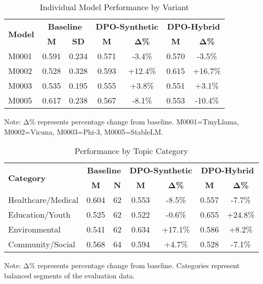 \begin{table}[htbp]
\centering
\caption{Individual Model Performance by Variant}
\label{tab:model-specific}
\begin{tabular}{lcccccc}
\toprule
\multirow{2}{*}{\textbf{Model}} & \multicolumn{2}{c}{\textbf{Baseline}} & \multicolumn{2}{c}{\textbf{DPO-Synthetic}} & \multicolumn{2}{c}{\textbf{DPO-Hybrid}} \\
\cmidrule(lr){2-3} \cmidrule(lr){4-5} \cmidrule(lr){6-7}
& \textbf{M} & \textbf{SD} & \textbf{M} & \textbf{Δ\%} & \textbf{M} & \textbf{Δ\%} \\
\midrule
M0001 & 0.591 & 0.234 & 0.571 & -3.4\% & 0.570 & -3.5\% \\
M0002 & 0.528 & 0.328 & 0.593 & +12.4\% & 0.615 & +16.7\% \\
M0003 & 0.535 & 0.195 & 0.555 & +3.8\% & 0.551 & +3.1\% \\
M0005 & 0.617 & 0.238 & 0.567 & -8.1\% & 0.553 & -10.4\% \\

\bottomrule
\end{tabular}
\begin{tablenotes}
\small
\item Note: Δ\% represents percentage change from baseline. M0001=TinyLlama, M0002=Vicuna, M0003=Phi-3, M0005=StableLM.
\end{tablenotes}
\end{table}



\begin{table}[htbp]
\centering
\caption{Performance by Topic Category}
\label{tab:category-analysis}
\begin{tabular}{lcccccc}
\toprule
\multirow{2}{*}{\textbf{Category}} & \multicolumn{2}{c}{\textbf{Baseline}} & \multicolumn{2}{c}{\textbf{DPO-Synthetic}} & \multicolumn{2}{c}{\textbf{DPO-Hybrid}} \\
\cmidrule(lr){2-3} \cmidrule(lr){4-5} \cmidrule(lr){6-7}
& \textbf{M} & \textbf{N} & \textbf{M} & \textbf{Δ\%} & \textbf{M} & \textbf{Δ\%} \\
\midrule
Healthcare/Medical & 0.604 & 62 & 0.553 & -8.5\% & 0.557 & -7.7\% \\
Education/Youth & 0.525 & 62 & 0.522 & -0.6\% & 0.655 & +24.8\% \\
Environmental & 0.541 & 62 & 0.634 & +17.1\% & 0.586 & +8.2\% \\
Community/Social & 0.568 & 64 & 0.594 & +4.7\% & 0.528 & -7.1\% \\

\bottomrule
\end{tabular}
\begin{tablenotes}
\small
\item Note: Δ\% represents percentage change from baseline. Categories represent balanced segments of the evaluation data.
\end{tablenotes}
\end{table}



